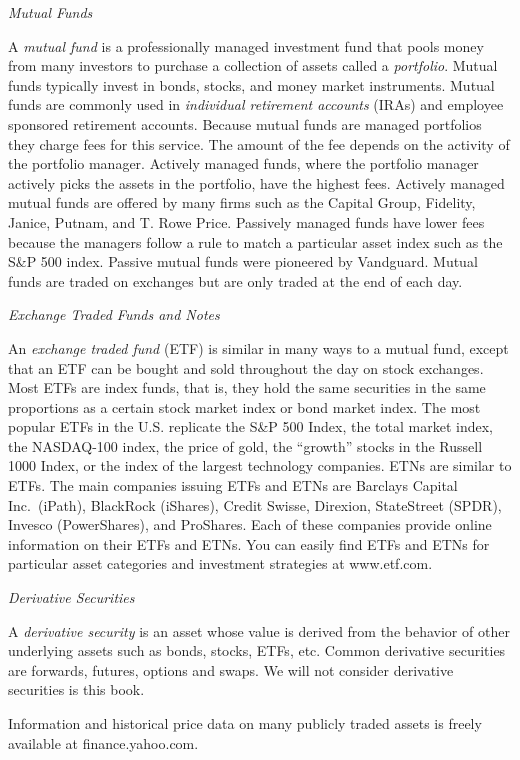 \documentclass[
  letterpaper,
  DIV=11,
  numbers=noendperiod]{scrreprt}
\theoremstyle{definition}
\theoremstyle{definition}
\theoremstyle{remark}
\begin{document}
\emph{Mutual Funds}

A \emph{mutual fund} is a professionally managed investment fund that
pools money from many investors to purchase a collection of assets
called a \emph{portfolio}. Mutual funds typically invest in bonds,
stocks, and money market instruments. Mutual funds are commonly used in
\emph{individual retirement accounts} (IRAs) and employee sponsored
retirement accounts. Because mutual funds are managed portfolios they
charge fees for this service. The amount of the fee depends on the
activity of the portfolio manager. Actively managed funds, where the
portfolio manager actively picks the assets in the portfolio, have the
highest fees. Actively managed mutual funds are offered by many firms
such as the Capital Group, Fidelity, Janice, Putnam, and T. Rowe Price.
Passively managed funds have lower fees because the managers follow a
rule to match a particular asset index such as the S\&P 500 index.
Passive mutual funds were pioneered by Vandguard. Mutual funds are
traded on exchanges but are only traded at the end of each day.

\emph{Exchange Traded Funds and Notes}

An \emph{exchange traded fund} (ETF) is similar in many ways to a mutual
fund, except that an ETF can be bought and sold throughout the day on
stock exchanges. Most ETFs are index funds, that is, they hold the same
securities in the same proportions as a certain stock market index or
bond market index. The most popular ETFs in the U.S. replicate the S\&P
500 Index, the total market index, the NASDAQ-100 index, the price of
gold, the ``growth'' stocks in the Russell 1000 Index, or the index of
the largest technology companies. ETNs are similar to ETFs. The main
companies issuing ETFs and ETNs are Barclays Capital Inc.~(iPath),
BlackRock (iShares), Credit Swisse, Direxion, StateStreet (SPDR),
Invesco (PowerShares), and ProShares. Each of these companies provide
online information on their ETFs and ETNs. You can easily find ETFs and
ETNs for particular asset categories and investment strategies at
www.etf.com.

\emph{Derivative Securities}

A \emph{derivative security} is an asset whose value is derived from the
behavior of other underlying assets such as bonds, stocks, ETFs, etc.
Common derivative securities are forwards, futures, options and swaps.
We will not consider derivative securities is this book.

Information and historical price data on many publicly traded assets is
freely available at finance.yahoo.com.
\end{document}
